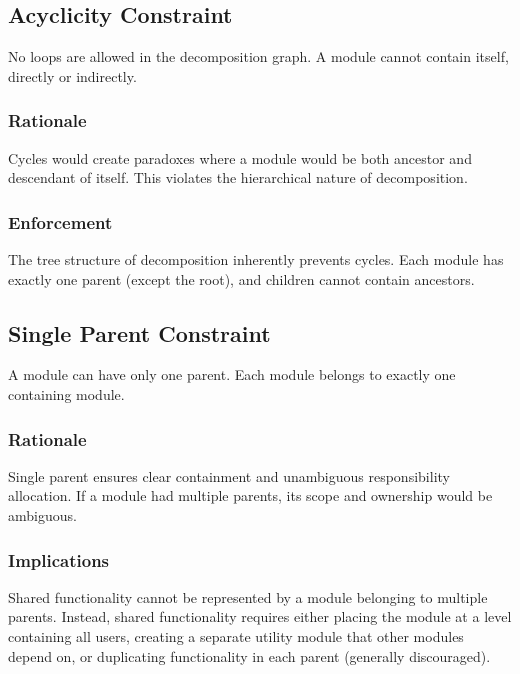 \documentclass[11pt]{article}
\begin{document}
\subsection{Acyclicity Constraint}

No loops are allowed in the decomposition graph. A module cannot contain itself, directly or indirectly.

\subsubsection{Rationale}

Cycles would create paradoxes where a module would be both ancestor and descendant of itself. This violates the hierarchical nature of decomposition.

\subsubsection{Enforcement}

The tree structure of decomposition inherently prevents cycles. Each module has exactly one parent (except the root), and children cannot contain ancestors.

\subsection{Single Parent Constraint}

A module can have only one parent. Each module belongs to exactly one containing module.

\subsubsection{Rationale}

Single parent ensures clear containment and unambiguous responsibility allocation. If a module had multiple parents, its scope and ownership would be ambiguous.

\subsubsection{Implications}

Shared functionality cannot be represented by a module belonging to multiple parents. Instead, shared functionality requires either placing the module at a level containing all users, creating a separate utility module that other modules depend on, or duplicating functionality in each parent (generally discouraged).
\end{document}
